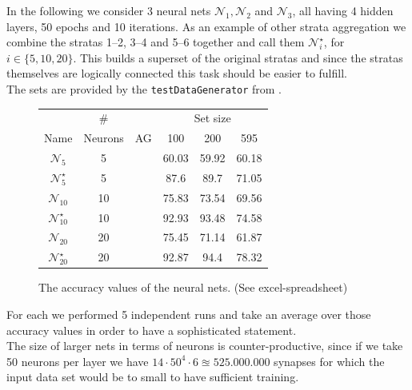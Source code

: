 \documentclass[runningheads]{llncs}
\newcommand{\cmark}{\ding{51}}%
\newcommand{\xmark}{\ding{55}}%
\begin{document}
	In the following we consider 3 neural nets $\mathcal{N}_1,\mathcal{N}_2$ and $\mathcal{N}_3$, all having 4 hidden layers, 50 epochs and 10 iterations.	
	As an example of other strata aggregation we combine the stratas 1--2, 3--4 and 5--6 together and call them $\mathcal{N}_i^\star$, for $i \in \{5,10,20\}$. This builds a superset of the original stratas and since the stratas themselves are logically connected this task should be easier to fulfill.\\
	The sets are provided by the \texttt{testDataGenerator} from .
	\setlength\tabcolsep{.2cm}
	\begin{figure}[H]
	\centering
	\begin{tabular}{|c|c|c|c|c|c|}
		\hline
		                         &   \#    &        & \multicolumn{3}{c|}{Set size} \\
		          Name           & Neurons &   AG   &  100  &  200  &      595      \\ \hline
		    $\mathcal{N}_5$      &    5    & \xmark & 60.03 & 59.92 &     60.18     \\
		 $\mathcal{N}_5^\star$   &    5    & \cmark & 87.6  & 89.7  &     71.05     \\
		   $\mathcal{N}_{10}$    &   10    & \xmark & 75.83 & 73.54 &     69.56     \\
		$\mathcal{N}_{10}^\star$ &   10    & \cmark & 92.93 & 93.48 &     74.58     \\		
		   $\mathcal{N}_{20}$    &   20    & \xmark & 75.45 & 71.14 &     61.87     \\
		$\mathcal{N}_{20}^\star$ &   20    & \cmark & 92.87 & 94.4  &     78.32     \\ \hline
	\end{tabular}
	\caption{The accuracy values of the neural nets. (See excel-spreadsheet)}
	\label{tab: nn-accuracy}
	\end{figure}

	For each we performed 5 independent runs and take an average over those accuracy values in order to have a sophisticated statement.\\


	The size of larger nets in terms of neurons is counter-productive, since if we take 50 neurons per layer we have $14 \cdot 50^4 \cdot 6 \approxeq 525.000.000$ synapses for which the input data set would be to small to have sufficient training.\\


	
	
\end{document}

